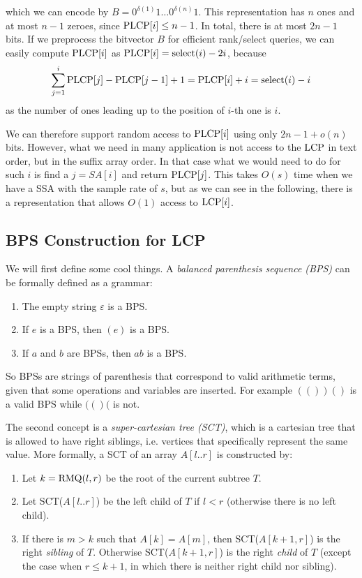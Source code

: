 which we can encode by $B=  0^{\delta(1)}1 \ldots 0^{\delta(n)}1$. This representation has $n$ ones and at most $n-1$ zeroes, since $\text{P}\text{LCP}[i] \leq n-1$. In total, there is at most $2n-1$ bits.
If we preprocess the bitvector $B$ for efficient rank/select queries, we can easily compute $\text{P}\text{LCP}[i]$ as $\text{P}\text{LCP}[i] = \text{select}(i) - 2i$, because $$\sum_{j=1}^i \text{P}\text{LCP}[j] - \text{P}\text{LCP}[j-1] + 1 =  \text{P}\text{LCP}[i] + i = \text{select}(i) - i$$ as the number of ones leading up to the position of $i$-th one is $i$.


We can therefore support random access to $\text{P}\text{LCP}[i]$ using only $2n-1 + o(n)$ bits. However, what we need in many application is not access to the $\text{LCP}$ in text order, but in the suffix array order. In that case what we would need to do for such $i$ is find a $j = SA[i]$ and return $\text{P}\text{LCP}[j]$.
This takes $O(s)$ time when we have a SSA with the sample rate of $s$, but as we can see in the following, there is a representation that allows $O(1)$ access to $\text{LCP}[i]$.

\subsection{BPS Construction for LCP}
We will first define some cool things. A \textit{balanced parenthesis sequence (BPS)} can be formally defined as a grammar:

\begin{enumerate}
    \item The empty string $\varepsilon$ is a BPS.
    \item If $e$ is a BPS, then $(e)$ is a BPS.
    \item If $a$ and $b$ are BPSs, then $ab$ is a BPS.
\end{enumerate}

So BPSs are strings of parenthesis that correspond to valid arithmetic terms, given that some operations and variables are inserted. For example $(())()$ is a valid BPS while $(()($ is not.

The second concept is a \textit{super-cartesian tree (SCT)}, which is a cartesian tree that is allowed to have right siblings, i.e. vertices that specifically represent the same value.
More formally, a SCT of an array $A[l..r]$ is constructed by:
\begin{enumerate}
    \item Let $k = \text{RMQ}(l, r)$ be the root of the current subtree $T$.
    \item Let SCT($A[l..r]$) be the left child of $T$ if $l < r$ (otherwise there is no left child).
    \item If there is $m > k$ such that $A[k] = A[m]$, then SCT($A[k+1, r]$) is the right \textit{sibling} of $T$. Otherwise SCT($A[k+1, r]$) is the right \textit{child} of $T$ (except the case when $r \leq k+1$, in which there is neither right child nor sibling).
\end{enumerate}

